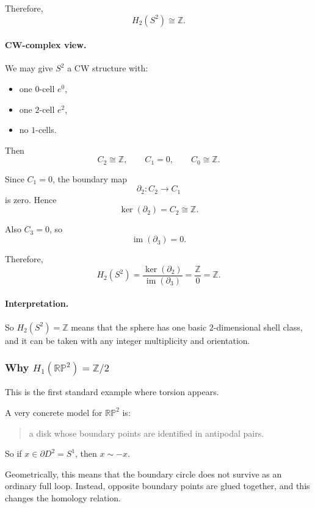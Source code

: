 \documentclass[12pt,a4paper]{article}
\theoremstyle{notespace}
\begin{document}
Therefore,
\[
H_2(S^2)\cong \mathbb Z.
\]

\paragraph{CW-complex view.}
We may give \(S^2\) a CW structure with:

\begin{itemize}
	\item one \(0\)-cell \(e^0\),
	\item one \(2\)-cell \(e^2\),
	\item no \(1\)-cells.
\end{itemize}

Then
\[
C_2\cong \mathbb Z,\qquad C_1=0,\qquad C_0\cong \mathbb Z.
\]

Since \(C_1=0\), the boundary map
\[
\partial_2:C_2\to C_1
\]
is zero. Hence
\[
\ker(\partial_2)=C_2\cong \mathbb Z.
\]

Also \(C_3=0\), so
\[
\operatorname{im}(\partial_3)=0.
\]

Therefore,
\[
H_2(S^2)=\frac{\ker(\partial_2)}{\operatorname{im}(\partial_3)}
=\frac{\mathbb Z}{0}
=\mathbb Z.
\]

\paragraph{Interpretation.}
So \(H_2(S^2)=\mathbb Z\) means that the sphere has one basic \(2\)-dimensional shell class, and it can be taken with any integer multiplicity and orientation.

\subsubsection{Why \texorpdfstring{$H_1(\mathbb{RP}^2)=\mathbb Z/2$}{H1(RP2)=Z/2}}

This is the first standard example where torsion appears.

A very concrete model for \(\mathbb{RP}^2\) is:

\begin{quote}
	a disk whose boundary points are identified in antipodal pairs.
\end{quote}

So if \(x\in \partial D^2=S^1\), then \(x\sim -x\).

Geometrically, this means that the boundary circle does not survive as an ordinary full loop. Instead, opposite boundary points are glued together, and this changes the homology relation.
\end{document}
